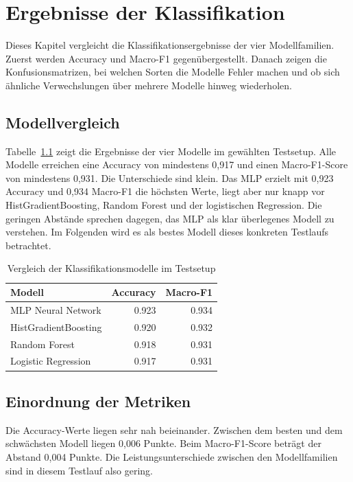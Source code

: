 \chapter{Ergebnisse der Klassifikation}\label{chap:Ergebnisse-der-Klassifikation}
Dieses Kapitel vergleicht die Klassifikationsergebnisse der vier Modellfamilien. Zuerst werden Accuracy und Macro-F1 gegenübergestellt. Danach zeigen die Konfusionsmatrizen, bei welchen Sorten die Modelle Fehler machen und ob sich ähnliche Verwechslungen über mehrere Modelle hinweg wiederholen.


\section{Modellvergleich}
Tabelle~\ref{tab:modelle_ergebnisse} zeigt die Ergebnisse der vier Modelle im gewählten Testsetup. Alle Modelle erreichen eine Accuracy von mindestens 0{,}917 und einen Macro-F1-Score von mindestens 0{,}931. Die Unterschiede sind klein. Das MLP erzielt mit 0{,}923 Accuracy und 0{,}934 Macro-F1 die höchsten Werte, liegt aber nur knapp vor HistGradientBoosting, Random Forest und der logistischen Regression.
Die geringen Abstände sprechen dagegen, das MLP als klar überlegenes Modell zu verstehen. Im Folgenden wird es als bestes Modell dieses konkreten Testlaufs betrachtet.
\begin{table}[htbp]
\centering
\begin{tabular}{lrr}
\toprule
Modell & Accuracy & Macro-F1 \\
\midrule
MLP Neural Network & 0.923 & 0.934 \\
HistGradientBoosting & 0.920 & 0.932 \\
Random Forest & 0.918 & 0.931 \\
Logistic Regression & 0.917 & 0.931 \\
\bottomrule
\end{tabular}
\caption{Vergleich der Klassifikationsmodelle im Testsetup}
\label{tab:modelle_ergebnisse}
\end{table}

\section{Einordnung der Metriken}
Die Accuracy-Werte liegen sehr nah beieinander. Zwischen dem besten und dem schwächsten Modell liegen 0{,}006 Punkte. Beim Macro-F1-Score beträgt der Abstand 0{,}004 Punkte. Die Leistungsunterschiede zwischen den Modellfamilien sind in diesem Testlauf also gering.

